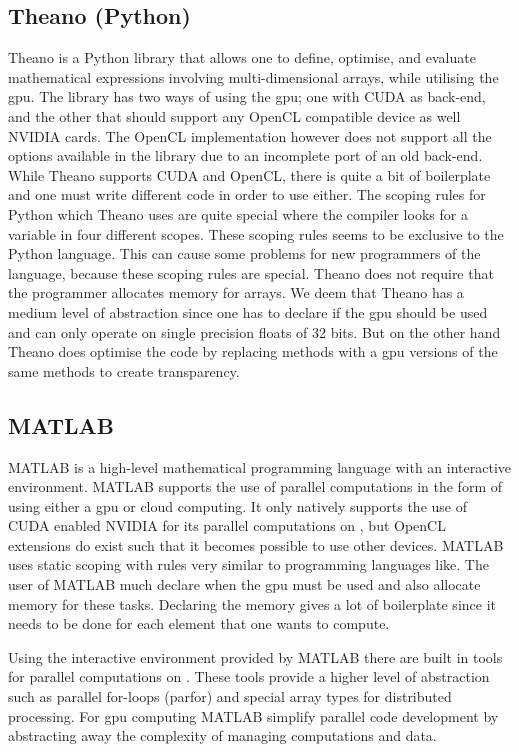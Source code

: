 \subsection{Theano (Python)}
Theano is a Python library that allows one to define, optimise, and evaluate mathematical expressions involving multi-dimensional arrays, while utilising the \acrshort{gpu}.
The library has two ways of using the \acrshort{gpu}; one with CUDA as back-end, and the other that should support any OpenCL compatible device as well NVIDIA cards.
The OpenCL implementation however does not support all the options available in the library due to an incomplete port of an old back-end.
While Theano supports CUDA and OpenCL, there is quite a bit of boilerplate and one must write different code in order to use either.	
The scoping rules for Python which Theano uses are quite special where the compiler looks for a variable in four different scopes.
These scoping rules seems to be exclusive to the Python language.
This can cause some problems for new programmers of the language, because these scoping rules are special.
 Theano does not require that the programmer allocates memory for arrays.
We deem that Theano has a medium level of abstraction since one has to declare if the \acrshort{gpu} should be used and can only operate on single precision floats of 32 bits.
But on the other hand Theano does optimise the code by replacing methods with a \acrshort{gpu} versions of the same methods to create transparency. \citep{Theano,Theano_GPU,bergstratheano, LEGB}

\subsection{MATLAB}
MATLAB is a high-level mathematical programming language with an interactive environment.
MATLAB supports the use of parallel computations in the form of using either a \acrshort{gpu} or cloud computing.
It only natively supports the use of CUDA enabled NVIDIA  for its parallel computations on , but OpenCL extensions do exist such that it becomes possible to use other devices.
MATLAB uses static scoping  with rules very similar to programming languages like.
The user of MATLAB much declare when the \acrshort{gpu} must be used and also allocate memory for these tasks.
Declaring the memory gives a lot of boilerplate since it needs to be done for each element that one wants to compute. \citep{MATLAB_backend,MATLAB_benchmark}

Using the interactive environment provided by MATLAB there are built in tools for parallel computations on .
These tools provide a higher level of abstraction such as parallel for-loops (parfor) and special array types for distributed processing.
For \acrshort{gpu} computing MATLAB simplify parallel code development by abstracting away the complexity of managing computations and data. \citep{MATLAB_parallel}

